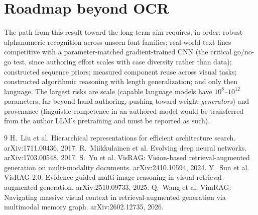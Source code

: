 \documentclass[11pt]{article}
\begin{document}
\section{Roadmap beyond OCR}\label{sec:roadmap}
The path from this result toward the long-term aim requires, in order: robust alphanumeric
recognition across unseen font families; real-world text lines competitive with a
parameter-matched gradient-trained CNN (the critical go/no-go test, since authoring effort
scales with case diversity rather than data); constructed sequence priors; measured component
reuse across visual tasks; constructed algorithmic reasoning with length generalization; and
only then language. The largest risks are scale (capable language models have
$10^8$--$10^{12}$ parameters, far beyond hand authoring, pushing toward weight
\emph{generators}) and provenance (linguistic competence in an authored model would be
transferred from the author LLM's pretraining and must be reported as such).

\begin{thebibliography}{9}
 H.~Liu et al. Hierarchical representations for efficient architecture search. arXiv:1711.00436, 2017.
 R.~Miikkulainen et al. Evolving deep neural networks. arXiv:1703.00548, 2017.
 S.~Yu et al. VisRAG: Vision-based retrieval-augmented generation on multi-modality documents. arXiv:2410.10594, 2024.
 Y.~Sun et al. VisRAG 2.0: Evidence-guided multi-image reasoning in visual retrieval-augmented generation. arXiv:2510.09733, 2025.
 Q.~Wang et al. VimRAG: Navigating massive visual context in retrieval-augmented generation via multimodal memory graph. arXiv:2602.12735, 2026.
\end{thebibliography}
\end{document}
